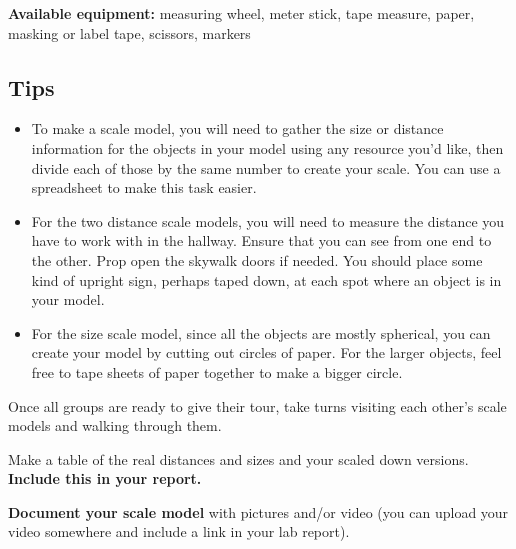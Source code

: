 \textbf{Available equipment:} measuring wheel, meter stick, tape measure, paper, masking or label tape, scissors, markers


\subsection{Tips}
\begin{itemize}
	\item To make a scale model, you will need to gather the size or distance information for the objects in your model using any resource you'd like, then divide each of those by the same number to create your scale. You can use a spreadsheet to make this task easier.
	
	\item For the two distance scale models, you will need to measure the distance you have to work with in the hallway.
	Ensure that you can see from one end to the other.
	Prop open the skywalk doors if needed.
	You should place some kind of upright sign, perhaps taped down, at each spot where an object is in your model.
	
	\item For the size scale model, since all the objects are mostly spherical, you can create your model by cutting out circles of paper. For the larger objects, feel free to tape sheets of paper together to make a bigger circle.
\end{itemize}

\begin{steps}
	
	\item Once all groups are ready to give their tour, take turns visiting each other's scale models and walking through them.
	
	\item Make a table of the real distances and sizes and your scaled down versions. \textbf{Include this in your report.}
	
	\item \textbf{Document your scale model} with pictures and/or video (you can upload your video somewhere and include a link in your lab report).
\end{steps}

